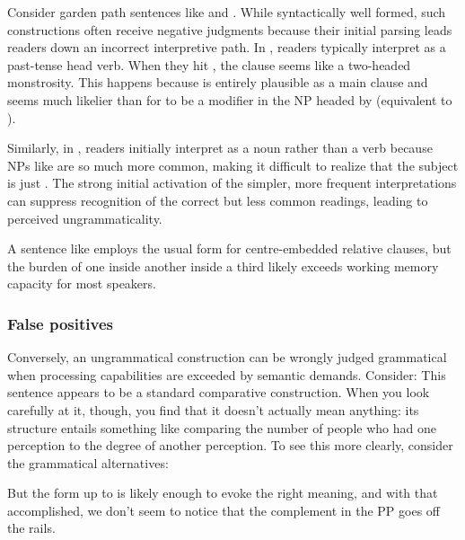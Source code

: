 Consider garden path sentences like  and . While syntactically well formed, such constructions often receive negative judgments because their initial parsing leads readers down an incorrect interpretive path. In , readers typically interpret  as a past-tense head verb. When they hit , the clause seems like a two-headed monstrosity. This happens because  is entirely plausible as a main clause and seems much likelier than for  to be a modifier in the NP headed by  (equivalent to ).

Similarly, in , readers initially interpret  as a noun rather than a verb because NPs like  are so much more common, making it difficult to realize that the subject is just . The strong initial activation of the simpler, more frequent interpretations can suppress recognition of the correct but less common readings, leading to perceived ungrammaticality.

A sentence like  employs the usual form for centre-embedded relative clauses, but the burden of one inside another inside a third likely exceeds working memory capacity for most speakers.

\subsubsection{False positives}
Conversely, an ungrammatical construction can be wrongly judged grammatical when processing capabilities are exceeded by semantic demands. Consider:
\z
This sentence appears to be a standard comparative construction. When you look carefully at it, though, you find that it doesn't actually mean anything: its structure entails something like comparing the number of people who had one perception to the degree of another perception. To see this more clearly, consider the grammatical alternatives:

\z
But the form up to  is likely enough to evoke the right meaning, and with that accomplished, we don't seem to notice that the complement in the  PP goes off the rails.

